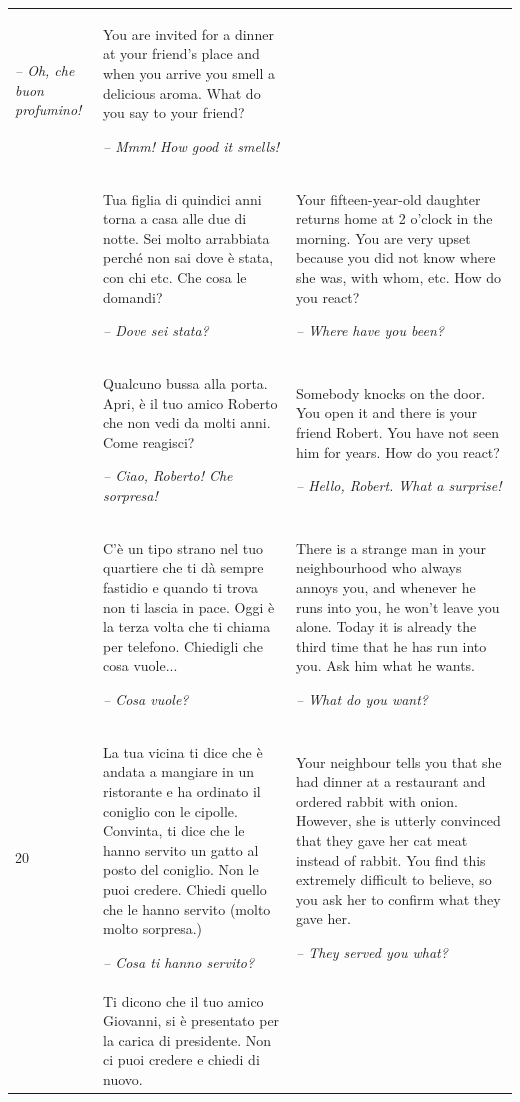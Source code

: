 \begin{xltabular}{\textwidth}{lQQ}
{\itshape -- Oh, che buon profumino!} & You are invited for a dinner at your friend’s place and when you arrive you smell a delicious aroma. What do you say to your friend?

{\itshape -- Mmm! How good it smells!}\\
 & Tua figlia di quindici anni torna a casa alle due di notte. Sei molto arrabbiata perché non sai dove è stata, con chi etc. Che cosa le domandi?

{\itshape -- Dove sei stata?} & Your fifteen-year-old daughter returns home at 2 o’clock in the morning. You are very upset because you did not know where she was, with whom, etc. How do you react?

{\itshape -- Where have you been?}\\
 & Qualcuno bussa alla porta. Apri, è il tuo amico Roberto che non vedi da molti anni. Come reagisci?

{\itshape -- Ciao, Roberto! Che sorpresa!} & Somebody knocks on the door. You open it and there is your friend Robert. You have not seen him for years. How do you react?

{\itshape -- Hello, Robert. What a surprise!}\\
 & C'è un tipo strano nel tuo quartiere che ti dà sempre fastidio e quando ti trova non ti lascia in pace. Oggi è la terza volta che ti chiama per telefono. Chiedigli che cosa vuole...

{\itshape -- Cosa vuole?} & There is a strange man in your neighbourhood who always annoys you, and whenever he runs into you, he won’t leave you alone. Today it is already the third time that he has run into you. Ask him what he wants.

{\itshape -- What do you want?}\\
20 & La tua vicina ti dice che è andata a mangiare in un ristorante e ha ordinato il coniglio con le cipolle. Convinta, ti dice che le hanno servito un gatto al posto del coniglio. Non le puoi credere. Chiedi quello che le hanno servito (molto molto sorpresa.)

\textit{-- Cosa ti hanno servito?} & Your neighbour tells you that she had dinner at a restaurant and ordered rabbit with onion. However, she is utterly convinced that they gave her cat meat instead of rabbit. You find this extremely difficult to believe, so you ask her to confirm what they gave her.

{\itshape -- They served you what?}\\
 & Ti dicono che il tuo amico Giovanni, si è presentato per la carica di presidente. Non ci puoi credere e chiedi di nuovo.


\end{xltabular}
